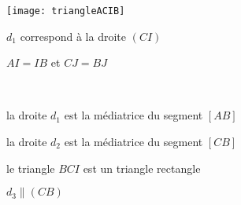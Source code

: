 \begin{QCM}
\begin{GroupeQCM}
\begin{exercice}
     \begin{minipage}[c]{0.32\textwidth}
     \quad \texttt{[image: triangleACIB]}
     \end{minipage} \hfill%
     \begin{minipage}[c]{0.66\textwidth}
     $d_1$ correspond à la droite $(CI)$
     
     $AI = IB$ et $CJ = BJ$
     \end{minipage} \\
      
      \begin{ChoixQCM}{4}
      \item la droite $d_1$ est la médiatrice du segment $[AB]$
      \item la droite $d_2$ est la médiatrice du segment $[CB]$
      \item le triangle $BCI$ est un triangle rectangle
      \item $d_3 \parallel (CB)$
      \end{ChoixQCM}
\begin{corrige}
   \end{corrige}
    \end{exercice}
    

\end{GroupeQCM}
\end{QCM}

  

